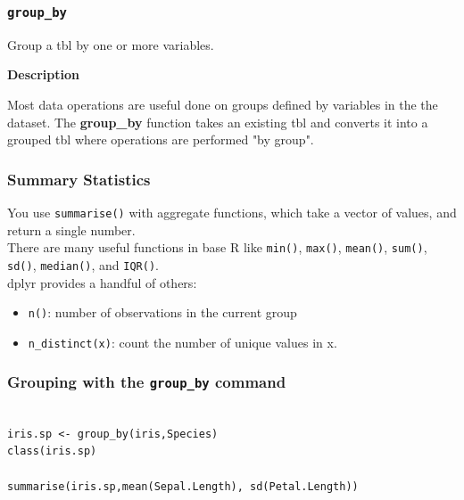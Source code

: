 \documentclass{beamer}
\begin{document}
\begin{frame}
\frametitle{\texttt{group\_by }}

Group a tbl by one or more variables.\\ \bigskip

\textbf{Description}\\ \bigskip

Most data operations are useful done on groups defined by variables in the the dataset. The
\textbf{group\_by} function takes an existing tbl and converts it into a grouped tbl where operations are
performed "by group".

\end{frame}
\begin{frame}
\frametitle{Summary Statistics}
You use \texttt{summarise()} with aggregate functions, which take a vector of values, and return a single number.\\ \bigskip There are many useful functions in base R like \texttt{min()}, \texttt{max()}, \texttt{mean()}, \texttt{sum()}, \texttt{sd()}, \texttt{median()}, and \texttt{IQR()}.\\ \bigskip dplyr provides a handful of others:
\begin{itemize}
\item 
\texttt{n()}: number of observations in the current group
\item 
\texttt{n\_distinct(x)}: count the number of unique values in x.
\end{itemize}

%
\end{frame}
\begin{frame}[fragile]
\frametitle{Grouping with the \texttt{group\_by} command}
\begin{verbatim}
	
iris.sp <- group_by(iris,Species)
class(iris.sp)
		
summarise(iris.sp,mean(Sepal.Length), sd(Petal.Length))

\end{verbatim}
\end{frame}
\end{document}
